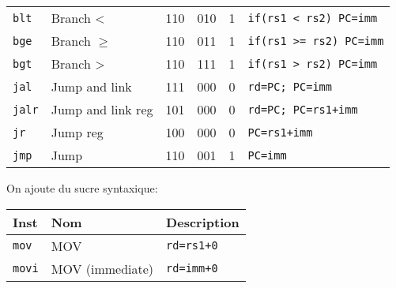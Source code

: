 \documentclass[a4paper]{article}
\begin{document}
\begin{longtable}{|l|l|c|c|c|l|}
        \texttt{blt}   & Branch <                        & 110    & 010    & 1      & \texttt{if(rs1 < rs2) PC=imm} \\
        \texttt{bge}   & Branch \(\geqslant\)            & 110    & 011    & 1      & \texttt{if(rs1 >= rs2) PC=imm}\\
        \texttt{bgt}   & Branch >                        & 110    & 111    & 1      & \texttt{if(rs1 > rs2) PC=imm} \\
        \hline
        \texttt{jal}   & Jump and link                   & 111    & 000    & 0      &\texttt{rd=PC; PC=imm}         \\
        \texttt{jalr}  & Jump and link reg               & 101    & 000    & 0      &\texttt{rd=PC; PC=rs1+imm}     \\
        \texttt{jr}    & Jump reg                        & 100    & 000    & 0      &\texttt{PC=rs1+imm}            \\
        \texttt{jmp}   & Jump                            & 110    & 001    & 1      &\texttt{PC=imm}                \\
        \hline
    \end{longtable}

    On ajoute du sucre syntaxique:

    \begin{longtable}{|l|l|l|}
        \hline
        Inst          & Nom             & Description       \\
        \hline
        \texttt{mov}  & MOV             & \texttt{rd=rs1+0} \\
        \texttt{movi} & MOV (immediate) & \texttt{rd=imm+0} \\
        \hline
    \end{longtable}
\end{document}
